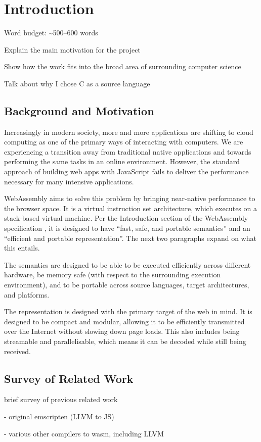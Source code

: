 \documentclass[00-main.tex]{subfiles}
\begin{document}
\chapter{Introduction}

\begin{mrwComment}
Word budget: \textasciitilde 500--600 words
\end{mrwComment}

\begin{mrwComment}
Explain the main motivation for the project

Show how the work fits into the broad area of surrounding computer science
\end{mrwComment}

\begin{mrwComment}
Talk about why I chose C as a source language
\end{mrwComment}

\section{Background and Motivation}

Increasingly in modern society, more and more applications are shifting to cloud computing as one of the primary ways of interacting with computers.
We are experiencing a transition away from traditional native applications and towards performing the same tasks in an online environment.
However, the standard approach of building web apps with JavaScript fails to deliver the performance necessary for many intensive applications.

WebAssembly aims to solve this problem by bringing near-native performance to the browser space.
It is a virtual instruction set architecture, which executes on a stack-based virtual machine.
Per the Introduction section of the WebAssembly specification , it is designed to have ``fast, safe, and portable semantics'' and an ``efficient and portable representation''.
The next two paragraphs expand on what this entails.

The semantics are designed to be able to be executed efficiently across different hardware, be memory safe (with respect to the surrounding execution environment), and to be portable across source languages, target architectures, and platforms.

The representation is designed with the primary target of the web in mind.
It is designed to be compact and modular, allowing it to be efficiently transmitted over the Internet without slowing down page loads.
This also includes being streamable and parallelisable, which means it can be decoded while still being received.



\section{Survey of Related Work}

\begin{mrwComment}
brief survey of previous related work

- original emscripten (LLVM to JS)

- various other compilers to wasm, including LLVM
\end{mrwComment}
\end{document}
